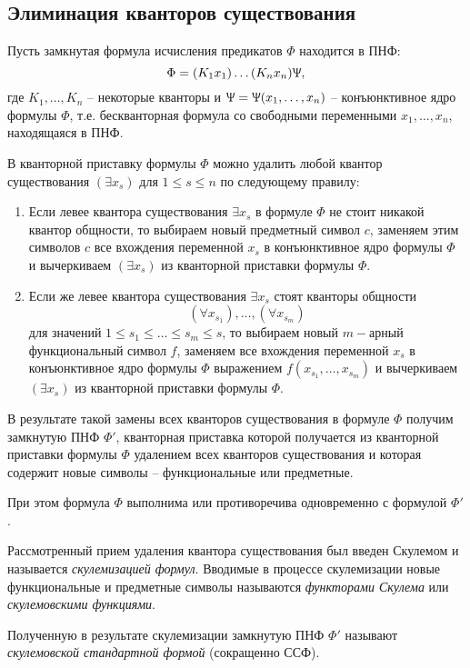 \subsection*{Элиминация кванторов существования}
Пусть замкнутая формула исчисления предикатов $\Phi$ находится в ПНФ:
$$\Phi = (K_1 x_1)\ldots(K_n x_n)\Uppsi,$$
где $K_1,\ldots,K_n$ -- некоторые кванторы и $\Uppsi = \Uppsi(x_1,\ldots,x_n)$ -- конъюнктивное ядро формулы $\Phi$, т.е. бескванторная формула со свободными переменными $x_1,\ldots,x_n$, находящаяся в ПНФ.

В кванторной приставку формулы $\Phi$ можно удалить любой квантор существования $(\exists x_s)$ для $1\leq s \leq n$ по следующему правилу:
\begin{enumerate}
    \item Если левее квантора существования $\exists x_s$ в формуле $\Phi$ не стоит никакой квантор общности, то выбираем новый предметный символ $c$, заменяем этим символов $c$ все вхождения переменной $x_s$ в конъюнктивное ядро формулы $\Phi$ и вычеркиваем $(\exists x_s)$ из кванторной приставки формулы $\Phi$.

    \item Если же левее квантора существования $\exists x_s$ стоят кванторы общности
    $$(\forall x_{s_1}),\ldots,(\forall x_{s_m})$$
    для значений $1\leq s_1\leq\ldots\leq s_m\leq s$, то выбираем новый $m-$арный функциональный символ $f$, заменяем все вхождения переменной $x_s$ в конъюнктивное ядро формулы $\Phi$ выражением $f(x_{s_1},\ldots,x_{s_m})$ и вычеркиваем  $(\exists x_s)$ из кванторной приставки формулы $\Phi$.
\end{enumerate}

В результате такой замены всех кванторов существования в формуле $\Phi$ получим замкнутую ПНФ $\Phi'$, кванторная приставка которой получается из кванторной приставки формулы $\Phi$ удалением всех кванторов существования и которая содержит новые символы -- функциональные или предметные.

При этом формула $\Phi$ выполнима или противоречива одновременно с формулой $\Phi'$.

Рассмотренный прием удаления квантора существования был введен Скулемом и называется \textit{скулемизацией формул}. Вводимые в процессе скулемизации новые функциональные и предметные символы называются \textit{функторами Скулема} или \textit{скулемовскими функциями}.

Полученную в результате скулемизации замкнутую ПНФ $\Phi'$ называют \textit{скулемовской стандартной формой} (сокращенно ССФ).

